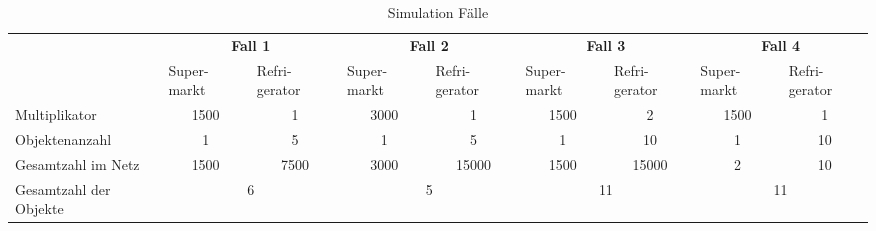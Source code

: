 \begin{table}
\footnotesize
\centering
\begin{tabularx}{\textwidth}{X|X|X|X|X|X|X|X|X|}
\cline{2-9}
& \multicolumn{2}{c|}{\textbf{Fall 1}} & \multicolumn{2}{c|}{\textbf{Fall 2}}
&  \multicolumn{2}{c|}{\textbf{Fall 3}} &  \multicolumn{2}{c|}{\textbf{Fall 4}}\\
 \cline{2-9}
& Super- \linebreak markt & Refri- \linebreak gerator & Super- \linebreak markt
& Refri- \linebreak gerator & Super- \linebreak markt & Refri-\linebreak gerator
& Super- \linebreak markt & Refri-\linebreak gerator \\
\hline
\multicolumn{1}{|l|}{Multiplikator} & \multicolumn{1}{c|}{1500} &
\multicolumn{1}{c|}{1} & \multicolumn{1}{c|}{3000} & \multicolumn{1}{c|}{1} &
\multicolumn{1}{c|}{1500} & \multicolumn{1}{c|}{2} & \multicolumn{1}{c|}{1500} &
\multicolumn{1}{c|}{1} \\
\hline
\multicolumn{1}{|l|}{Objektenanzahl} & \multicolumn{1}{c|}{1} &
\multicolumn{1}{c|}{5}& \multicolumn{1}{c|}{1} & \multicolumn{1}{c|}{5} &
\multicolumn{1}{c|}{1}& \multicolumn{1}{c|}{10} & \multicolumn{1}{c|}{1}&
\multicolumn{1}{c|}{10} \\
\hline
\multicolumn{1}{|l|}{Gesamtzahl im Netz} & \multicolumn{1}{c|}{1500} &
\multicolumn{1}{c|}{7500}& \multicolumn{1}{c|}{3000} & \multicolumn{1}{c|}{15000} &
\multicolumn{1}{c|}{1500} & \multicolumn{1}{c|}{15000} & \multicolumn{1}{c|}{2}&
\multicolumn{1}{c|}{10} \\
\hline
\multicolumn{1}{|l|}{Gesamtzahl der Objekte} & \multicolumn{2}{c|}{6} &
\multicolumn{2}{c|}{5} & \multicolumn{2}{c|}{11} & \multicolumn{2}{c|}{11}\\
\hline
\end{tabularx}
\caption{Simulation F\"alle}
\end{table}
